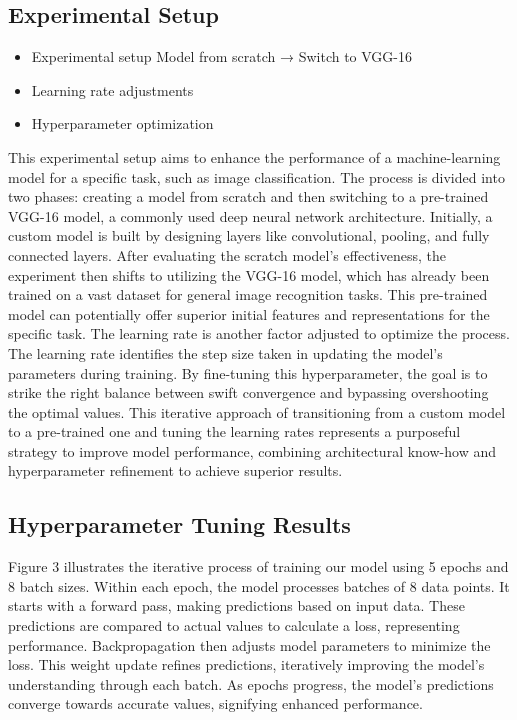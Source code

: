\documentclass[12pt,a4paper]{article}
\begin{document}
\subsection{Experimental Setup}


\begin{itemize}
    \item Experimental setup Model from scratch → Switch to VGG-16
    \item Learning rate adjustments
    \item Hyperparameter optimization
\end{itemize} 

This experimental setup aims to enhance the performance of a machine-learning model for a specific task, such as image classification. The process is divided into two phases: creating a model from scratch and then switching to a pre-trained VGG-16 model, a commonly used deep neural network architecture. Initially, a custom model is built by designing layers like convolutional, pooling, and fully connected layers. After evaluating the scratch model's effectiveness, the experiment then shifts to utilizing the VGG-16 model, which has already been trained on a vast dataset for general image recognition tasks. This pre-trained model can potentially offer superior initial features and representations for the specific task. The learning rate is another factor adjusted to optimize the process. The learning rate identifies the step size taken in updating the model's parameters during training. By fine-tuning this hyperparameter, the goal is to strike the right balance between swift convergence and bypassing overshooting the optimal values. This iterative approach of transitioning from a custom model to a pre-trained one and tuning the learning rates represents a purposeful strategy to improve model performance, combining architectural know-how and hyperparameter refinement to achieve superior results.


\subsection{Hyperparameter Tuning Results}

Figure 3 illustrates the iterative process of training our model using 5 epochs and 8 batch sizes. Within each epoch, the model processes batches of 8 data points. It starts with a forward pass, making predictions based on input data. These predictions are compared to actual values to calculate a loss, representing performance. Backpropagation then adjusts model parameters to minimize the loss. This weight update refines predictions, iteratively improving the model's understanding through each batch. As epochs progress, the model's predictions converge towards accurate values, signifying enhanced performance.
\end{document}

